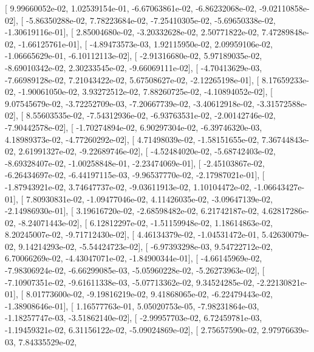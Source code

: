 \documentclass{article}
\begin{document}
       [  9.99660052e-02,   1.02539154e-01,  -6.67063861e-02,
         -6.86232068e-02,  -9.02110858e-02],
       [ -5.86350288e-02,   7.78223684e-02,  -7.25410305e-02,
         -5.69650338e-02,  -1.30619116e-01],
       [  2.85004680e-02,  -3.20332628e-02,   2.50771822e-02,
          7.47289848e-02,  -1.66125761e-01],
       [ -4.89473573e-03,   1.92115950e-02,   2.09959106e-02,
         -1.06665629e-01,  -6.10112113e-02],
       [ -2.91316680e-02,   5.97189035e-02,  -8.69010342e-02,
          2.30233545e-02,  -9.66069111e-02],
       [ -4.70413629e-03,  -7.66989128e-02,   7.21043422e-02,
          5.67508627e-02,  -2.12265198e-01],
       [  8.17659233e-02,  -1.90061050e-02,   3.93272512e-02,
          7.88260725e-02,  -4.10894052e-02],
       [  9.07545679e-02,  -3.72252709e-03,  -7.20667739e-02,
         -3.40612918e-02,  -3.31572588e-02],
       [  8.55603535e-02,  -7.54312936e-02,  -6.93763531e-02,
         -2.00142746e-02,  -7.90442578e-02],
       [ -1.70274894e-02,   6.90297304e-02,  -6.39746320e-03,
          4.18989373e-02,  -4.77260292e-02],
       [  4.71498039e-02,  -1.58151655e-02,   7.36744843e-02,
          2.61991327e-02,  -9.22689746e-02],
       [ -4.52484020e-02,  -5.68742403e-02,  -8.69328407e-02,
         -1.00258848e-01,  -2.23474069e-01],
       [ -2.45103867e-02,  -6.26434697e-02,  -6.44197115e-03,
         -9.96537770e-02,  -2.17987021e-01],
       [ -1.87943921e-02,   3.74647737e-02,  -9.03611913e-02,
          1.10104472e-02,  -1.06643427e-01],
       [  7.80930831e-02,  -1.09477046e-02,   4.11426035e-02,
         -3.09647139e-02,  -2.14986930e-01],
       [  3.19616720e-02,  -2.68598482e-02,   6.21742187e-02,
          4.62817286e-02,  -8.24071443e-02],
       [  6.12812297e-02,  -1.51159948e-02,   1.18614863e-02,
          8.20245007e-02,  -9.71712430e-02],
       [  4.46134379e-02,  -1.04531472e-01,   5.42630079e-02,
          9.14214293e-02,  -5.54424723e-02],
       [ -6.97393298e-03,   9.54722712e-02,   6.70066269e-02,
         -4.43047071e-02,  -1.84900344e-01],
       [ -4.66145969e-02,  -7.98306924e-02,  -6.66299085e-03,
         -5.05960228e-02,  -5.26273963e-02],
       [ -7.10907351e-02,  -9.61611338e-03,  -5.07713362e-02,
          9.34524285e-02,  -2.22130821e-01],
       [  8.01773600e-02,  -9.19816219e-02,   9.41868065e-02,
         -6.22479443e-02,  -1.38908646e-01],
       [  1.16577763e-01,   5.05020753e-05,  -7.98231864e-03,
         -1.18257747e-03,  -3.51862140e-02],
       [ -2.99957703e-02,   6.72459781e-03,  -1.19459321e-02,
          6.31156122e-02,  -5.09024869e-02],
       [  2.75657590e-02,   2.97976639e-03,   7.84335529e-02,
\end{document}
